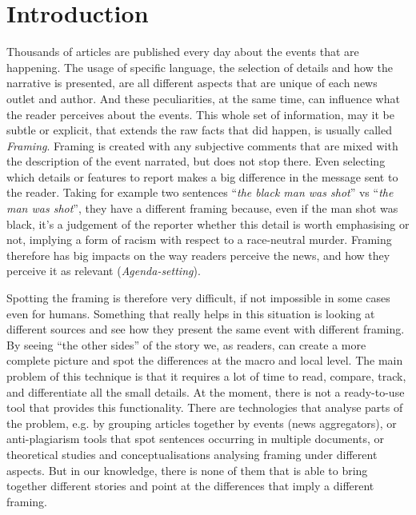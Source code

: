 \chapter{Introduction}


Thousands of articles are published every day about the events that are happening.
The usage of specific language, the selection of details and how the narrative is presented, are all different aspects that are unique of each news outlet and author.
And these peculiarities, at the same time, can influence what the reader perceives about the events.
This whole set of information, may it be subtle or explicit, that extends the raw facts that did happen, is usually called \emph{Framing}.
Framing is created with any subjective comments that are mixed with the description of the event narrated, but does not stop there.
Even selecting which details or features to report makes a big difference in the message sent to the reader.
Taking for example two sentences ``\textit{the black man was shot}'' vs ``\textit{the man was shot}'', they have a different framing because, even if the man shot was black, it's a judgement of the reporter whether this detail is worth emphasising or not, implying a form of racism with respect to a race-neutral murder.
Framing therefore has big impacts on the way readers perceive the news, and how they perceive it as relevant (\textit{Agenda-setting}).



Spotting the framing is therefore very difficult, if not impossible in some cases even for humans. Something that really helps in this situation is looking at different sources and see how they present the same event with different framing.
By seeing ``the other sides'' of the story we, as readers, can create a more complete picture and spot the differences at the macro and local level.
The main problem of this technique is that it requires a lot of time to read, compare, track, and differentiate all the small details.
At the moment, there is not a ready-to-use tool that provides this functionality.
There are technologies that analyse parts of the problem, e.g. by grouping articles together by events (news aggregators), or anti-plagiarism tools that spot sentences occurring in multiple documents, or theoretical studies and conceptualisations analysing framing under different aspects.
But in our knowledge, there is none of them that is able to bring together different stories and point at the differences that imply a different framing.


